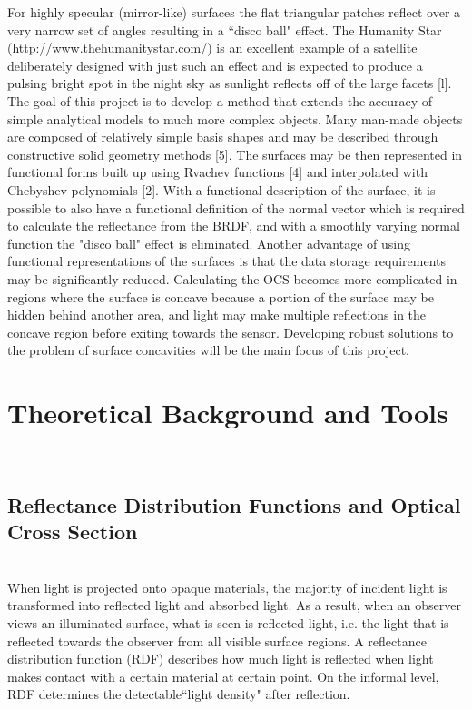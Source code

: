 \documentclass[11pt]{amsart}
\theoremstyle{definition}
\begin{document}
For highly specular (mirror-like) surfaces the flat triangular
patches reflect over a very narrow set of angles resulting in a ``disco ball" effect. The Humanity Star
(http://www.thehumanitystar.com/) is an excellent example of a satellite deliberately designed with just such an effect and
is expected to produce a pulsing bright spot in the night sky as sunlight reflects off of the large facets [l].
The goal of this project is to develop a method that extends the accuracy of simple analytical models to much more complex
objects. Many man-made objects are composed of relatively simple basis shapes and may be described through constructive
solid geometry methods [5]. The surfaces may be then represented in functional forms built up using Rvachev functions [4] and interpolated with Chebyshev polynomials [2]. With a functional description of the surface, it is possible to also have a functional
definition of the normal vector which is required to calculate the reflectance from the BRDF, and with a smoothly varying
normal function the "disco ball" effect is eliminated. Another advantage of using functional representations of the surfaces
is that the data storage requirements may be significantly reduced. Calculating the OCS becomes more complicated in
regions where the surface is concave because a portion of the surface may be hidden behind another area, and light may
make multiple reflections in the concave region before exiting towards the sensor. Developing robust solutions to the
problem of surface concavities will be the main focus of this project.

\section{Theoretical Background and Tools}~\\
\subsection{Reflectance Distribution Functions and Optical Cross Section}~\\
When light is projected onto opaque materials, the majority of incident light is transformed into reflected light and absorbed light. As a result, when an observer views an illuminated surface, what is seen is reflected light, i.e. the light that is reflected towards the observer from all visible surface regions. A reflectance distribution function (RDF) describes how much light is reflected when light makes contact with a certain material at certain point. On the informal level, RDF determines the detectable``light density" after reflection. 
\end{document}
